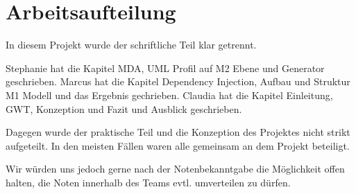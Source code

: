 \chapter{Arbeitsaufteilung}
\label{Arbeitsaufteilung}
In diesem Projekt wurde der schriftliche Teil klar getrennt.

Stephanie hat die Kapitel MDA, UML Profil auf M2 Ebene und Generator
geschrieben.
Marcus hat die Kapitel Dependency Injection, Aufbau und Struktur M1 Modell und
das Ergebnis gechrieben.
Claudia hat die Kapitel Einleitung, GWT, Konzeption und Fazit und Ausblick
geschrieben.

Dagegen wurde der praktische Teil und die Konzeption des Projektes nicht
strikt aufgeteilt. In den meisten Fällen waren alle gemeinsam an dem Projekt
beteiligt.

Wir würden uns jedoch gerne nach der Notenbekanntgabe die Möglichkeit offen
halten, die Noten innerhalb des Teams evtl. umverteilen zu dürfen.


